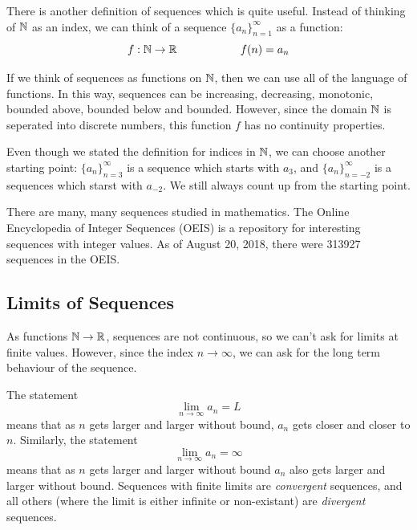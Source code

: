 \documentclass[fleqn]{report}
\begin{document}
\begin{defn}There is another definition of sequences which is
quite useful. Instead of thinking of $\mathbb{N}$ as an index, we can
think of a sequence $\{a_n\}_{n=1}^\infty$ as a function:
\begin{equation*}
f: \mathbb{N} \rightarrow \mathbb{R} \hspace{2cm} f(n) = a_n
\end{equation*}
\end{defn}

If we think of sequences as functions on $\mathbb{N}$, then we can
use all of the language of functions. In this way, sequences
can be increasing, decreasing, monotonic, bounded above,
bounded below and bounded. However, since the domain $\mathbb{N}$ is
seperated into discrete numbers, this function $f$ has no
continuity properties.

Even though we stated the definition for indices in $\mathbb{N}$, we
can choose another starting point: $\{a_n\}_{n=3}^\infty$ is a
sequence which starts with $a_3$, and $\{a_n\}_{n=-2}^\infty$
is a sequences which starst with $a_{-2}$. We still always
count up from the starting point.

There are many, many sequences studied in mathematics. The
Online Encyclopedia of Integer Sequences (OEIS) is a
repository for interesting sequences with integer values. As
of August 20, 2018, there were 313927 sequences in the OEIS.

\subsection{Limits of Sequences}
\label{sequences-limits}

As functions $\mathbb{N} \rightarrow \mathbb{R}$, sequences are not
continuous, so we can't ask for limits at finite values.
However, since the index $n \rightarrow \infty$, we can ask
for the long term behaviour of the sequence. 

\begin{defn}
The statement
\begin{equation*}
\lim_{n \rightarrow \infty} a_n = L
\end{equation*}
means that as $n$ gets larger and larger without bound, $a_n$
gets closer and closer to $n$. Similarly, the statement 
\begin{equation*}
\lim_{n \rightarrow \infty} a_n = \infty
\end{equation*}
means that as $n$ gets larger and larger without bound $a_n$
also gets larger and larger without bound. 
Sequences with finite limits are \emph{convergent} sequences,
and all others (where the limit is either infinite or
non-existant) are \emph{divergent} sequences.
\end{defn}
\end{document}
